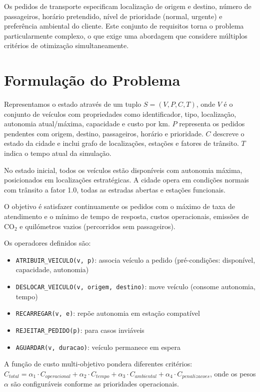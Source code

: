 \documentclass[11pt,a4paper]{article}
\begin{document}
Os pedidos de transporte especificam localização de origem e destino, número de passageiros, horário pretendido, nível de prioridade (normal, urgente) e preferência ambiental do cliente. Este conjunto de requisitos torna o problema particularmente complexo, o que exige uma abordagem que considere múltiplos critérios de otimização simultaneamente.

\section{Formulação do Problema}

Representamos o estado através de um tuplo $S = (V, P, C, T)$, onde $V$ é o conjunto de veículos com propriedades como identificador, tipo, localização, autonomia atual/máxima, capacidade e custo por km. $P$ representa os pedidos pendentes com origem, destino, passageiros, horário e prioridade. $C$ descreve o estado da cidade e inclui grafo de localizações, estações e fatores de trânsito. $T$ indica o tempo atual da simulação.

No estado inicial, todos os veículos estão disponíveis com autonomia máxima, posicionados em localizações estratégicas. A cidade opera em condições normais com trânsito a fator 1.0, todas as estradas abertas e estações funcionais.

O objetivo é satisfazer continuamente os pedidos com o máximo de taxa de atendimento e o mínimo de tempo de resposta, custos operacionais, emissões de CO$_2$ e quilómetros vazios (percorridos sem passageiros).

Os operadores definidos são:
\begin{itemize}
    \item \texttt{ATRIBUIR\_VEICULO(v, p)}: associa veículo a pedido (pré-condições: disponível, capacidade, autonomia)
    \item \texttt{DESLOCAR\_VEICULO(v, origem, destino)}: move veículo (consome autonomia, tempo)
    \item \texttt{RECARREGAR(v, e)}: repõe autonomia em estação compatível
    \item \texttt{REJEITAR\_PEDIDO(p)}: para casos inviáveis
    \item \texttt{AGUARDAR(v, duracao)}: veículo permanece em espera
\end{itemize}

A função de custo multi-objetivo pondera diferentes critérios: $C_{total} = \alpha_1 \cdot C_{operacional} + \alpha_2 \cdot C_{tempo} + \alpha_3 \cdot C_{ambiental} + \alpha_4 \cdot C_{penalizacoes}$, onde os pesos $\alpha$ são configuráveis conforme as prioridades operacionais.
\end{document}
